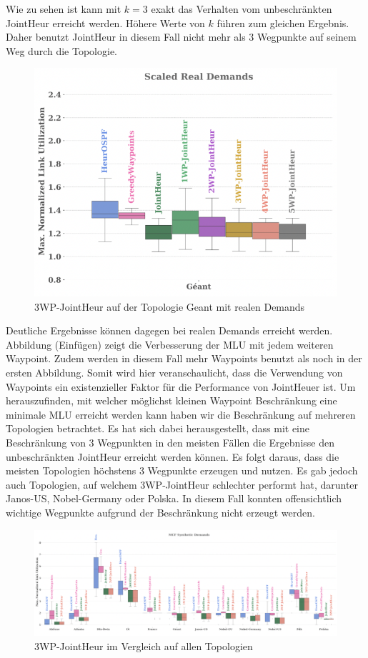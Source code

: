 \documentclass[sigconf]{acmart}
\begin{document}
Wie zu sehen ist kann mit $k = 3$ exakt das Verhalten vom unbeschränkten JointHeur erreicht werden. 
Höhere Werte von $k$ führen zum gleichen Ergebnis. Daher benutzt JointHeur in diesem Fall nicht mehr als 3
Wegpunkte auf seinem Weg durch die Topologie.
\begin{figure}[h]
  \centering
  \includegraphics[width=\linewidth]{abbildungen/realDemtopokwp}
  \caption{3WP-JointHeur auf der Topologie Geant mit realen Demands}
\end{figure}
Deutliche Ergebnisse können dagegen bei realen Demands erreicht werden. Abbildung (Einfügen) zeigt die Verbesserung der 
MLU mit jedem weiteren Waypoint. Zudem werden in diesem Fall mehr Waypoints benutzt als noch in der ersten Abbildung.
Somit wird hier veranschaulicht, dass die Verwendung von Waypoints ein existenzieller Faktor für die Performance von JointHeuer ist.  
Um herauszufinden, mit welcher möglichst kleinen Waypoint Beschränkung eine minimale MLU erreicht werden kann haben wir die Beschränkung
auf mehreren Topologien betrachtet. Es hat sich dabei herausgestellt, dass mit eine Beschränkung von 3 Wegpunkten in den meisten Fällen
die Ergebnisse den unbeschränkten JointHeur erreicht werden können. Es folgt daraus, dass die meisten Topologien höchstens 3 Wegpunkte erzeugen und nutzen.
Es gab jedoch auch Topologien, auf welchem  3WP-JointHeur schlechter performt hat, darunter Janos-US, Nobel-Germany oder Polska. In diesem Fall
konnten offensichtlich wichtige Wegpunkte aufgrund der Beschränkung nicht erzeugt werden.
\begin{figure}[h]
  \centering
  \includegraphics[width=\linewidth]{abbildungen/allTopologieskwp}
  \caption{3WP-JointHeur im Vergleich auf allen Topologien}
\end{figure}
\end{document}
